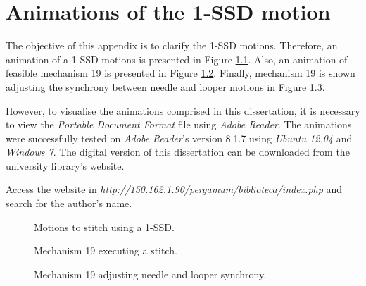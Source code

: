 \chapter{Animations of the 1-SSD motion}
\label{appendix:animations}
The objective of this appendix is to clarify the 1-SSD motions. Therefore, an animation of a 1-SSD motions is presented in Figure \ref{figura:animate_motions}. Also, an animation of feasible mechanism 19 is presented in Figure \ref{figura:animate_mech_19}. Finally, mechanism 19 is shown adjusting the synchrony between needle and looper motions in Figure \ref{figura:animate_mech_19_adj}.

However, to visualise the animations comprised in this dissertation, it is necessary to view the \textit{Portable Document Format} file using \textit{Adobe Reader}. The animations were successfully tested on \textit{Adobe Reader}'s version 8.1.7 using \textit{Ubuntu 12.04} and \textit{Windows 7}. The digital version of this dissertation can be downloaded from the university library's website.

Access the website in \textit{http://150.162.1.90/pergamum/biblioteca/index.php} and search for the author's name.

\begin{figure}[h]
\centering
{}
\caption{Motions to stitch using a 1-SSD.}
\label{figura:animate_motions}
\end{figure}

\begin{figure}[h]
\centering
{}
\caption{Mechanism 19 executing a stitch.}
\label{figura:animate_mech_19}
\end{figure}

\begin{figure}[h]
\centering
{}
\caption{Mechanism 19 adjusting needle and looper synchrony.}
\label{figura:animate_mech_19_adj}
\end{figure}
